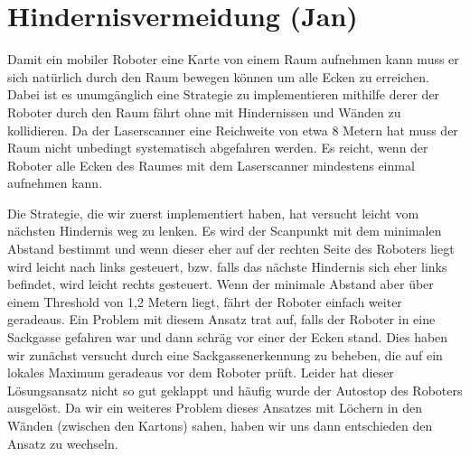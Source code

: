 \section{Hindernisvermeidung (Jan)}

Damit ein mobiler Roboter eine Karte von einem Raum aufnehmen kann muss er sich natürlich durch den Raum bewegen können um alle Ecken zu erreichen. Dabei ist es unumgänglich eine Strategie zu implementieren mithilfe derer der Roboter durch den Raum fährt ohne mit Hindernissen und Wänden zu kollidieren.
Da der Laserscanner eine Reichweite von etwa 8 Metern hat muss der Raum nicht unbedingt systematisch abgefahren werden. Es reicht, wenn der Roboter alle Ecken des Raumes mit dem Laserscanner mindestens einmal aufnehmen kann.

Die Strategie, die wir zuerst implementiert haben, hat versucht leicht vom nächsten Hindernis weg zu lenken. Es wird der Scanpunkt mit dem minimalen Abstand bestimmt und wenn dieser eher auf der rechten Seite des Roboters liegt wird leicht nach links gesteuert, bzw. falls das nächste Hindernis sich eher links befindet, wird leicht rechts gesteuert. Wenn der minimale Abstand aber über einem Threshold von 1,2 Metern liegt, fährt der Roboter einfach weiter geradeaus.
Ein Problem mit diesem Ansatz trat auf, falls der Roboter in eine Sackgasse gefahren war und dann schräg vor einer der Ecken stand.
Dies haben wir zunächst versucht durch eine Sackgassenerkennung zu beheben, die auf ein lokales Maximum geradeaus vor dem Roboter prüft.
Leider hat dieser Lösungsansatz nicht so gut geklappt und häufig wurde der Autostop des Roboters ausgelöst. Da wir ein weiteres Problem dieses Ansatzes mit Löchern in den Wänden (zwischen den Kartons) sahen, haben wir uns dann entschieden den Ansatz zu wechseln.


